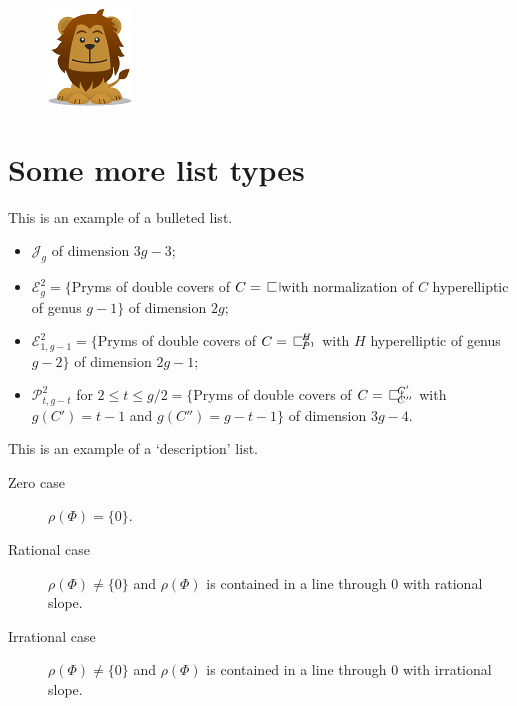 \documentclass{amsart}
\theoremstyle{definition}
\theoremstyle{remark}
\numberwithin{equation}{section}
\newcommand{\blankbox}[2]{%
  \parbox{\columnwidth}{\centering
    \setlength{\fboxsep}{0pt}%
    \fbox{\raisebox{0pt}[#2]{\hspace{#1}}}%
  }%
}
\begin{document}
\begin{figure}[tb]
\includegraphics{lion.png}
\caption{}\label{otherfig}
\end{figure}

\section{Some more list types}
This is an example of a bulleted list.

\begin{itemize}
\item $\mathcal{J}_g$ of dimension $3g-3$;
\item $\mathcal{E}^2_g=\{$Pryms of double covers of $C=\openbox$ with
normalization of $C$ hyperelliptic of genus $g-1\}$ of dimension $2g$;
\item $\mathcal{E}^2_{1,g-1}=\{$Pryms of double covers of
$C=\openbox^H_{P^1}$ with $H$ hyperelliptic of genus $g-2\}$ of
dimension $2g-1$;
\item $\mathcal{P}^2_{t,g-t}$ for $2\le t\le g/2=\{$Pryms of double
covers of $C=\openbox^{C'}_{C''}$ with $g(C')=t-1$ and $g(C'')=g-t-1\}$
of dimension $3g-4$.
\end{itemize}

This is an example of a `description' list.

\begin{description}
\item[Zero case] $\rho(\Phi) = \{0\}$.

\item[Rational case] $\rho(\Phi) \ne \{0\}$ and $\rho(\Phi)$ is
contained in a line through $0$ with rational slope.

\item[Irrational case] $\rho(\Phi) \ne \{0\}$ and $\rho(\Phi)$ is
contained in a line through $0$ with irrational slope.
\end{description}
\end{document}
